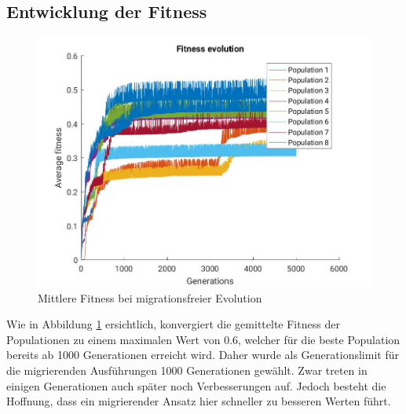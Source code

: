 \documentclass[12pt,a4paper]{article}
\begin{document}
\subsection{Entwicklung der Fitness}
\begin{figure}
\centering
\includegraphics[width=.8\textwidth]{plain-fit.jpg}
\caption{Mittlere Fitness bei migrationsfreier Evolution}
\label{fig:plain_fit}
\end{figure}
Wie in Abbildung \ref{fig:plain_fit} ersichtlich, konvergiert die gemittelte Fitness der Populationen zu einem maximalen Wert von $0.6$, welcher für die beste Population bereits ab 1000 Generationen erreicht wird. Daher wurde als Generationslimit für die migrierenden Ausführungen 1000 Generationen gewählt. Zwar treten in einigen Generationen auch später noch Verbesserungen auf. Jedoch besteht die Hoffnung, dass ein migrierender Ansatz hier schneller zu besseren Werten führt.
\end{document}
